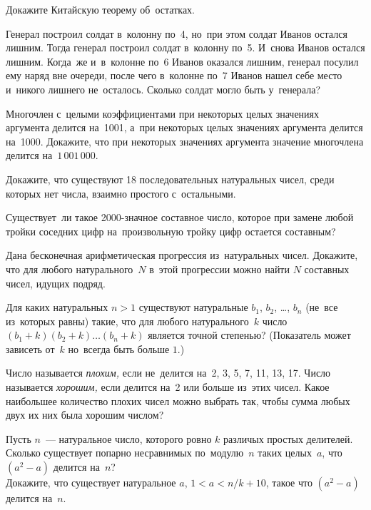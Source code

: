 \begin{problems}

\item
Докажите Китайскую теорему об~остатках.

\item
Генерал построил солдат в~колонну по~4, но~при этом солдат Иванов остался
лишним.
Тогда генерал построил солдат в~колонну по~5.
И~снова Иванов остался лишним.
Когда~же и~в~колонне по~6 Иванов оказался лишним, генерал посулил ему наряд вне
очереди, после чего в~колонне по~7 Иванов нашел себе место и~никого лишнего
не~осталось.
Сколько солдат могло быть у~генерала?

\item
Многочлен с~целыми коэффициентами при некоторых целых значениях аргумента
делится на~1001, а~при некоторых целых значениях аргумента делится на~1000.
Докажите, что при некоторых значениях аргумента значение многочлена делится
на~$1\,001\,000$.

\item
Докажите, что существуют 18 последовательных натуральных чисел, среди которых
нет числа, взаимно простого с~остальными.

\item
Существует~ли такое 2000-значное составное число, которое при замене любой
тройки соседних цифр на~произвольную тройку цифр остается составным?

\item
Дана бесконечная арифметическая прогрессия из~натуральных чисел.
Докажите, что для любого натурального~$N$ в~этой прогрессии можно найти $N$
составных чисел, идущих подряд.

\item
Для каких натуральных $n > 1$ существуют натуральные
$b_1$, $b_2$, \ldots, $b_n$ (не~все из~которых равны) такие, что для любого
натурального~$k$ число $(b_{1} + k) (b_{2} + k) \ldots (b_{n} + k)$ является
точной степенью?
(Показатель может зависеть от~$k$ но~всегда быть больше $1$.)

\item
Число называется \emph{плохим,} если не~делится на~2, 3, 5, 7, 11, 13, 17.
Число называется \emph{хорошим,} если делится на~2 или больше из~этих чисел.
Какое наибольшее количество плохих чисел можно выбрать так, чтобы сумма любых
двух их них была хорошим числом?

\item
Пусть $n$~--- натуральное число, которого ровно $k$ различых простых делителей.
\\
\subproblem
Сколько существует попарно несравнимых по~модулю~$n$ таких целых~$a$, что
$(a^2 - a)$ делится на~$n$?
\\
\subproblem
Докажите, что существует натуральное $a$, $1 < a < n / k + 10$, такое что
$(a^2 - a)$ делится на~$n$.

\end{problems}

